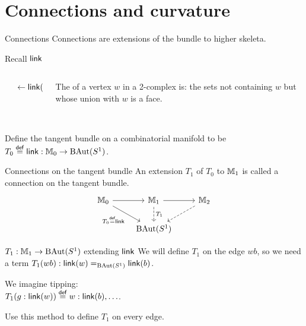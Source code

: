 \section{Connections and curvature}

\begin{frame}{Connections}
Connections are extensions of the bundle to higher skeleta.
\end{frame}

\begin{frame}{Recall \( \operatorname{\mathsf{link}} \)}
\begin{columns}
\begin{column}{0.25\textwidth}

\end{column}
\begin{column}{0.15\textwidth}
\( \leftarrow\operatorname{\mathsf{link}}(w) \)
\end{column}
\begin{column}{0.6\textwidth}
The  of a vertex \( w \) in a 2-complex is: the sets not containing \( w \) but whose union with \( w \) is a face.\\~\\
\end{column}
\end{columns}
Define \alert{the tangent bundle} on a combinatorial manifold to be \( T_0\stackrel{\mathsf{def}}{=}\operatorname{\mathsf{link}}:\mathbb{M}_0\to\operatorname{BAut}(S^1) \).
\end{frame}

\begin{frame}{Connections on the tangent bundle}
An extension \( T_1 \) of \( T_0 \) to \( \mathbb{M}_1 \) is called \alert{a connection on the tangent bundle}.
\[\begin{tikzcd}[ampersand replacement=\&]
  {\mm_0} \& {\mm_1} \& {\mm_2} \\
  \& {\BAut(S^1)}
  \arrow[from=1-1, to=1-2]
  \arrow["{T_0\defeq\link}"', from=1-1, to=2-2]
  \arrow[from=1-2, to=1-3]
  \arrow["{T_1}", dashed, from=1-2, to=2-2]
  \arrow[dashed, from=1-3, to=2-2]
\end{tikzcd}\]
\end{frame}

\begin{frame}{\( T_1:\mathbb{M}_1\to\operatorname{BAut}(S^1) \) extending \( \operatorname{\mathsf{link}} \)}
We will define \( T_1 \) on the edge \( wb \), so we need a term \( T_1(wb):\operatorname{\mathsf{link}}(w)=_{\operatorname{BAut}(S^1)}\operatorname{\mathsf{link}}(b) \).

We imagine tipping:
\[\]
\( T_1(g:\operatorname{\mathsf{link}}(w))\stackrel{\mathsf{def}}{=} w:\operatorname{\mathsf{link}}(b),\ldots \).

Use this method to define \( T_1 \) on every edge.
\end{frame}

